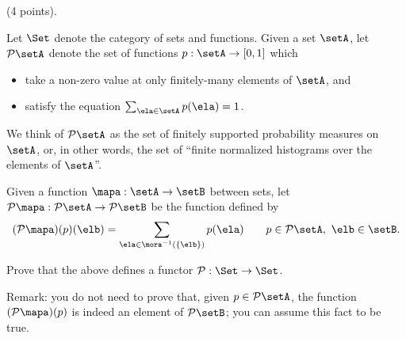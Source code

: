 \documentclass[paper=8.125in:10.250in,pagesize=pdftex,
    headinclude=false,footinclude=false,oneside,egregdoesnotlikesansseriftitles]{kaobook}
\begin{document}

\newpage


\begin{gradedexercise}\label{ex:ProbFunc} (4 points).


Let $\Set$ denote the category of sets and functions. 
Given a set $\setA$, let $\mathcal{P} \setA$ denote the set of functions $p: \setA \to [0,1]$ which 
\begin{itemize}
\item take a non-zero value at only finitely-many elements of $\setA$, and 
\item satisfy the equation $\sum_{\ela \in \setA} p(\ela) = 1$. 
\end{itemize}
We think of $\mathcal{P} \setA$ as the set of finitely supported probability measures on $\setA$, or, in other words, the set of ``finite normalized histograms over the elements of $\setA$''. 

Given a function $\mapa: \setA \to \setB$ between sets, let $\mathcal{P} \mapa: \mathcal{P}\setA \to \mathcal{P}\setB$ be the function defined by 
$$ (\mathcal{P} \mapa)(p)(\elb) = \sum_{\ela \in \mora^{-1}(\{ \elb \})} p(\ela) \quad \quad  p \in \mathcal{P}\setA, \  \elb \in \setB.$$

Prove that the above defines a functor $\mathcal{P}: \Set \to \Set$. 

Remark: you do not need to prove that, given $p \in \mathcal{P}\setA$, the function $(\mathcal{P} \mapa)(p)$ is indeed an element of $\mathcal{P}\setB$; you can assume this fact to be true. 
\end{gradedexercise}


\newpage
\end{document}
